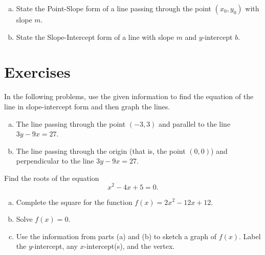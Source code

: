 \documentclass[12pt]{amsart}
\begin{document}
\begin{thm}[2 Points]\label{ex1}
  \begin{enumerate}[(a)]
  \item
    State the Point-Slope form of a line passing through the point $(x_0, y_0)$ with slope $m$.
    \vspace{1in}
  \item
    State the Slope-Intercept form of a line with slope $m$ and $y$-intercept $b$.
    \vspace{1in}
  \end{enumerate}
\end{thm}
\newpage
\section{Exercises}

\begin{thm}[18 Points]\label{ex5}
  In the following problems, use the given information to find the equation of the line in slope-intercept form and then graph the lines.
  \begin{enumerate}[(a)]
  \item
    The line passing through the point $(-3, 3)$ and parallel to the line $3y - 9x = 27$.
    \vspace{3in}
  \item
    The line passing through the origin (that is, the point $(0,0)$) and perpendicular to the line $3y - 9x = 27$.
    \vspace{2in}
  \end{enumerate}
  \vspace{1in}
\end{thm}

\newpage
\begin{thm}[18 Points]\label{ex9}
  Find the roots of the equation
  $$x^2 - 4x + 5 = 0.$$
  \vspace{2in}
\end{thm}

\begin{thm}[18 Points]\label{ex10}
  \begin{enumerate}[(a)]
  \item
    Complete the square for the function $f(x) = 2x^2 - 12x + 12$.
    \vspace{1in}
  \item
    Solve $f(x) = 0$.
    \vspace{1in}
  \item
    Use the information from parts (a) and (b) to sketch a graph of $f(x)$.
    Label the $y$-intercept, any $x$-intercept(s), and the vertex.
    \vspace{2in}
  \end{enumerate}
\end{thm}
\end{document}
